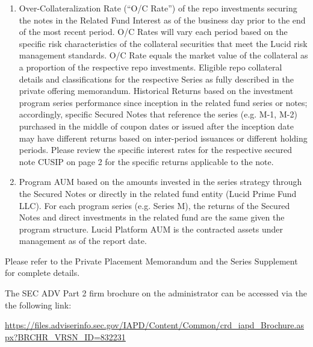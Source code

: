 \documentclass[9pt]{article}
\begin{document}
\begin{enumerate}
        \item Over-Collateralization Rate (``O/C Rate'') of the repo investments securing the notes in the Related Fund Interest as of the business day prior to the end of the most recent period. O/C Rates will vary each period based on the specific risk characteristics of the collateral securities that meet the Lucid risk management standards. O/C Rate equals the market value of the collateral as a proportion of the respective repo investments. Eligible repo collateral details and classifications for the respective Series as fully described in the private offering memorandum. Historical Returns based on the investment program series performance since inception in the related fund series or notes; accordingly, specific Secured Notes that reference the series (e.g. M-1, M-2) purchased in the middle of coupon dates or issued after the inception date may have different returns based on inter-period issuances or different holding periods. Please review the specific interest rates for the respective secured note CUSIP on page 2 for the specific returns applicable to the note.

        \item Program AUM based on the amounts invested in the series strategy through the Secured Notes or directly in the related fund entity (Lucid Prime Fund LLC). For each program series (e.g. Series M), the returns of the Secured Notes and direct investments in the related fund are the same given the program structure. Lucid Platform AUM is the contracted assets under management as of the report date.

    \end{enumerate}

    \noindent Please refer to the Private Placement Memorandum and the Series Supplement for complete details.

        {\color{gray} \noindent The SEC ADV Part 2 firm brochure on the administrator can be accessed via the the following link:

    \noindent\underline{https://files.adviserinfo.sec.gov/IAPD/Content/Common/crd\_iapd\_Brochure.aspx?BRCHR\_VRSN\_ID=832231}}
\end{document}
